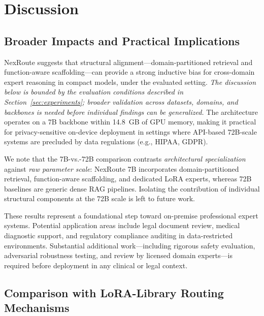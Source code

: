\documentclass[a4paper,fleql]{cas-sc}
\begin{document}
\section{Discussion}
\label{sec:discussion}

\subsection{Broader Impacts and Practical Implications}
NexRoute suggests that structural alignment---domain-partitioned retrieval
and function-aware scaffolding---can provide a strong inductive bias for
cross-domain expert reasoning in compact models, under the evaluated setting. \emph{The discussion below is
bounded by the evaluation conditions described in Section~\ref{sec:experiments};
broader validation across datasets, domains, and backbones is needed before
individual findings can be generalized.} The architecture operates on
a 7B backbone within 14.8~GB of GPU memory, making it practical for
privacy-sensitive on-device deployment in settings where API-based 72B-scale
systems are precluded by data regulations (e.g., HIPAA, GDPR).

We note that the 7B-vs.-72B comparison contrasts \emph{architectural specialization} against \emph{raw parameter scale}: NexRoute 7B incorporates domain-partitioned retrieval, function-aware scaffolding, and dedicated LoRA experts, whereas 72B baselines are generic dense RAG pipelines. Isolating the contribution of individual structural components at the 72B scale is left to future work.

These results represent a foundational step toward on-premise professional
expert systems. Potential application areas include legal document review,
medical diagnostic support, and regulatory compliance auditing in
data-restricted environments. Substantial additional work---including rigorous
safety evaluation, adversarial robustness testing, and review by licensed
domain experts---is required before deployment in any clinical or legal
context.

\subsection{Comparison with LoRA-Library Routing Mechanisms}
\label{ssec:moe_routing}
\end{document}
